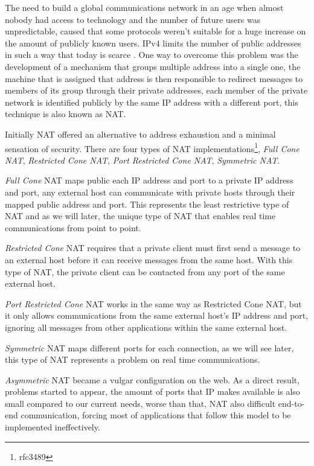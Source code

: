 The need to build a global communications network in an age when almost nobody had access to technology and the number of future users was unpredictable, caused that some protocols weren't suitable for a huge increase on the amount of publicly known users. \ac{IPv4} limits the number of public addresses in such a way that today is scarce \cite{ipv4}. One way to overcome this problem was the development of a mechanism that groups multiple address into a single one, the machine that is assigned that address is then responsible to redirect messages to members of its group through their private addresses, each member of the private network is identified publicly by the same \ac{IP} address with a different port, this technique is also known as \ac{NAT}.

Initially \ac{NAT} offered an alternative to address exhaustion and a minimal sensation of security. There are four types of \ac{NAT} implementations\footnote{rfc3489}, \textit{Full Cone NAT}, \textit{Restricted Cone NAT}, \textit{Port Restricted Cone NAT}, \textit{Symmetric NAT}.

\textit{Full Cone} \ac{NAT} maps public each \ac{IP} address and port to a private \ac{IP} address and port, any external host can communicate with private hosts through their mapped public address and port. This represents the least restrictive type of \ac{NAT} and as we will later, the unique type of \ac{NAT} that enables real time communications from point to point.

\textit{Restricted Cone} \ac{NAT} requires that a private client must first send a message to an external host before it can receive messages from the same host. With this type of \ac{NAT}, the private client can be contacted from any port of the same external host.

\textit{Port Restricted Cone} \ac{NAT} works in the same way as Restricted Cone \ac{NAT}, but it only allows communications from the same external host's IP address and port, ignoring all messages from other applications within the same external host.

\textit{Symmetric} NAT maps different ports for each connection, as we will see later, this type of \ac{NAT} represents a problem on real time communications.

\textit{Asymmetric} \ac{NAT} became a vulgar configuration on the web. As a direct result, problems started to appear, the amount of ports that \ac{IP} makes available is also small compared to our current needs, worse than that, \ac{NAT} also difficult end-to-end communication, forcing most of applications that follow this model to be implemented ineffectively.

